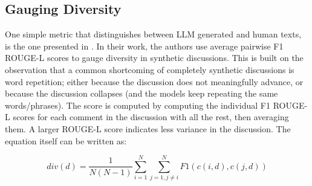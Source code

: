 \subsection{Gauging Diversity}
\label{ssec:methodology:evaluating}

One simple metric that distinguishes between LLM generated and human texts, is the one presented in \citet{ulmer2024}. In their work, the authors use average pairwise F1 ROUGE-L scores \cite{lin-2004-rouge} to gauge diversity in synthetic discussions. This is built on the observation that a common shortcoming of completely synthetic discussions is word repetition; either because the discussion does not meaningfully advance, or because the discussion collapses (and the models keep repeating the same words/phrases). The score is computed by computing the individual F1 ROUGE-L scores for each comment in the discussion with all the rest, then averaging them. A larger ROUGE-L score indicates less variance in the discussion. The equation itself can be written as:

\small
\begin{equation}
\label{eq:variety}
    div(d) = \frac{1}{N(N-1)} \sum_{i=1}^N \sum_{j=1, j \neq i}^N F1(c(i, d), c(j, d))
\end{equation}
\normalsize